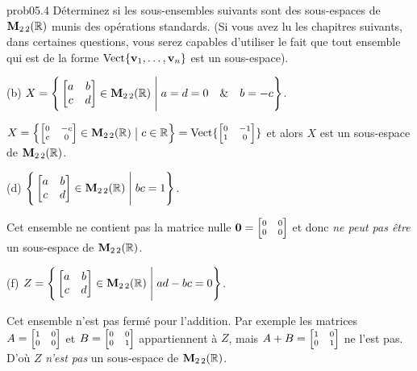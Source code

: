 \bigskip
\begin{sol}{prob05.4} Déterminez si les sous-ensembles suivants sont des sous-espaces de $\mathbf{M}_{2 \,2}(\mathbb{R})$ munis des opérations standards. (Si vous avez lu les chapitres suivants, dans certaines questions, vous serez capables d'utiliser le fait que tout ensemble qui est de la forme $\operatorname{ Vect} \normalsize\{\mathbf{v}_1, \dots, \mathbf{v}_n\normalsize\}$ est un sous-espace).
\medskip




(b)  $X=\Bigg\{  \bmatrix a&b\\ c&d\endbmatrix \in \M_{2 \,2}(\R) \;\Bigg|\;a=d=0\quad \&\quad b=-c  \Bigg\}$. 

\soln $X=\left\{  \scriptsize\bmatrix 0&-c\\ c&0\endbmatrix \in \M_{2 \,2}(\R) \;\Big|\;c\in \R \right\}=\sp{\scriptsize\bmatrix 0&-1\\ 1&0\endbmatrix}$ et alors $X$ est un sous-espace de $\mathbf{M}_{2 \,2}(\mathbb{R})$.\medskip


(d)  $\Bigg\{  \bmatrix a&b\\ c&d\endbmatrix \in \M_{2 \,2}(\R) \;\Bigg|\; bc=1\Bigg\}$. 

\soln Cet ensemble ne contient pas la matrice nulle  $\zero=\scriptsize\bmatrix 0&0\\ 0&0\endbmatrix$ et donc {\it ne peut pas être} un sous-espace de $\mathbf{M}_{2 \,2}(\mathbb{R})$.   \medskip


 (f)  $Z=\Bigg\{  \bmatrix a&b\\ c&d\endbmatrix \in \M_{2 \,2}(\R) \;\Bigg|\; ad-bc=0\Bigg\}$. 

\soln Cet ensemble n'est pas ferm\'e pour l'addition. Par exemple les matrices  $A=\scriptsize\bmatrix 1&0\\ 0&0\endbmatrix$ et $B=\scriptsize\bmatrix 0&0\\ 0&1\endbmatrix$ appartiennent \`a $Z$, mais $A+B=\scriptsize\bmatrix 1&0\\ 0&1\endbmatrix$ ne l'est pas. D'o\`u $Z$ {\it n'est pas} un sous-espace de $\mathbf{M}_{2 \,2}(\mathbb{R})$.   \medskip


\end{sol}

